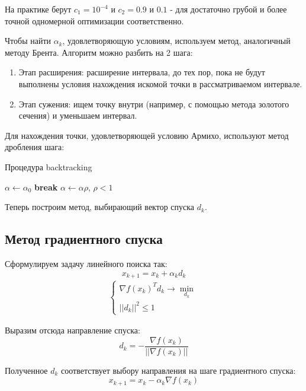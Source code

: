 \documentclass[a4paper, 12pt]{article}
\begin{document}
На практике берут $c_1 = 10^{-4}$ и $c_2 = 0.9$ и $0.1$ - для достаточно грубой и более точной одномерной оптимизации соответственно.


Чтобы найти $\alpha_k$, удовлетворяющую условиям, используем метод, аналогичный методу Брента. Алгоритм можно разбить на 2 шага:

\begin{enumerate}
    \item Этап расширения: расширение интервала, до тех пор, пока не будут выполнены условия нахождения искомой точки в рассматриваемом интервале.
    \item Этап сужения: ищем точку внутри (например, с помощью метода золотого сечения) и уменьшаем интервал. 
\end{enumerate}

Для нахождения точки, удовлетворяющей условию Армихо, используют метод дробления шага:

\begin{algorithm}
\caption{Процедура backtracking}\label{alg:backtrack}
\begin{algorithmic}[1]
\State $\alpha \gets \alpha_0$
\Loop
     \Then
    \State\textbf{break}
    \EndIf
    \State $\alpha \gets \alpha \rho$, $\rho < 1$
\EndLoop
\end{algorithmic}
\end{algorithm}

Теперь построим метод, выбирающий вектор спуска $d_k$.

\subsection{Метод градиентного спуска}

Сформулируем задачу линейного поиска так:
$$x_{k+1} = x_k + \alpha_k d_k$$
\begin{align*}
\begin{cases}
        \nabla f(x_k)^Td_k \rightarrow \min_{d_k}\\
        ||d_k||^2 \leq 1
\end{cases}
\end{align*}

Выразим отсюда направление спуска:
$$d_k = -\frac{\nabla f(x_k)}{||\nabla f(x_k)||}$$

Полученное $d_k$ соответствует выбору направления на шаге градиентного спуска:
$$x_{k+1} = x_k - \alpha_k \nabla f(x_k)$$
\end{document}
